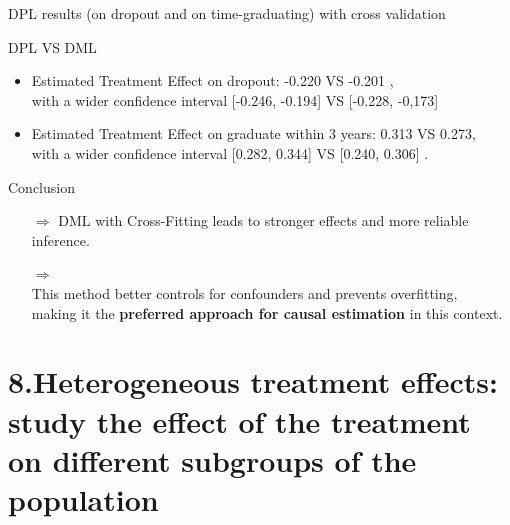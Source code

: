 \documentclass[aspectratio=169]{beamer}
\begin{document}
\begin{frame}{DPL results (on dropout and on time-graduating) with cross validation}

\vspace{15pt}
\begin{alertblock}{DPL VS DML }
	\begin{itemize}[label=--,itemsep=1pt,topsep=2pt]
	\item Estimated Treatment Effect on dropout: -0.220 VS -0.201 ,\\ with a wider confidence interval [-0.246, -0.194] VS [-0.228, -0,173]   
	\item Estimated Treatment Effect on graduate within 3 years:  0.313 VS 0.273,\\ 
    with a wider confidence interval [0.282, 0.344] VS [0.240, 0.306] .

\end{itemize}
\end{alertblock}
\vspace{5pt}

\begin{exampleblock}{Conclusion}
\vspace{-2pt}
\begin{itemize}

    \item [$\Rightarrow$]
DML with Cross-Fitting  leads to stronger effects and more reliable inference. 
\item [$\Rightarrow$] \\This method better controls for confounders and prevents overfitting, \\making it the \textbf{preferred approach for causal estimation} in this context.
\end{itemize}
\vspace{-3pt}
	
\end{exampleblock}

    
\end{frame}






\section{8.Heterogeneous treatment effects: study the effect of the treatment on different subgroups of the population}
\end{document}
